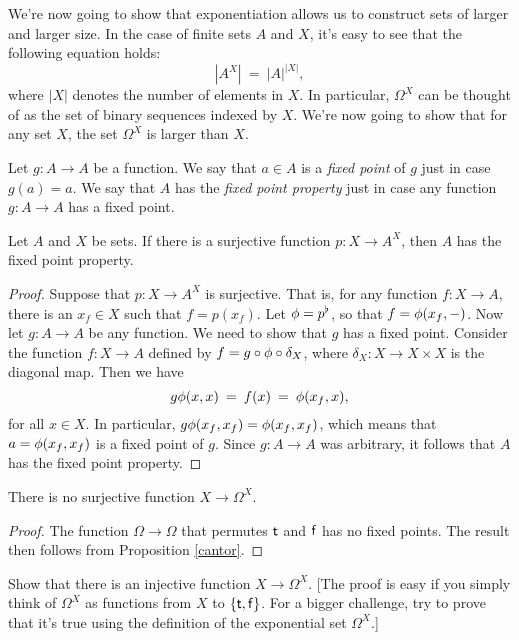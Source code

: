We're now going to show that exponentiation allows us to construct
sets of larger and larger size.  In the case of finite sets $A$ and
$X$, it's easy to see that the following equation holds:
\[ |A^X| \: = \: |A|^{|X|} ,\] where $|X|$ denotes the number of
elements in $X$.  In particular, $\Omega ^X$ can be thought of as the
set of binary sequences indexed by $X$.  We're now going to show that
for any set $X$, the set $\Omega ^X$ is larger than $X$.

\begin{defn} Let $g:A\to A$ be a function.  We say that $a\in A$ is a
  \emph{fixed point} of $g$ just in case $g(a)=a$.  We say that $A$
  has the \emph{fixed point property} just in case any function
  $g:A\to A$ has a fixed point. \end{defn}

\begin{prop} Let $A$ and $X$ be sets.  If there is a surjective
  function $p:X\to A^X$, then $A$ has the fixed point
  property. \label{cantor} \end{prop}

\begin{proof} Suppose that $p:X\to A^X$ is surjective.  That is, for
  any function $f:X\to A$, there is an $x_f\in X$ such that
  $f=p(x_f)$.  Let $\phi =p^\flat$, so that $f=\phi (x_f,-)$.  Now let
  $g:A\to A$ be any function.  We need to show that $g$ has a fixed
  point.  Consider the function $f:X\to A$ defined by $f=g\circ \phi
  \circ \delta _X$, where $\delta _X:X\to X\times X$ is the diagonal
  map.  Then we have
  \[ g\phi (x,x) \: = \: f(x) \: = \: \phi (x_f,x) ,\] for all $x\in X$.
  In particular, $g\phi (x_f,x_f)=\phi (x_f,x_f)$, which means that
  $a=\phi (x_f,x_f)$ is a fixed point of $g$.  Since $g:A\to A$ was
  arbitrary, it follows that $A$ has the fixed point property.
\end{proof}

\begin{prop} There is no surjective function $X\to \Omega
  ^X$. \end{prop}


\begin{proof} The function $\Omega\to \Omega$ that permutes $\mathsf{t}$ and
  $\mathsf{f}$ has no fixed points.  The result then follows from Proposition
  \ref{cantor}. \end{proof}

\begin{exercise} Show that there is an injective function $X\to \Omega
  ^X$.  [The proof is easy if you simply think of $\Omega ^X$ as
  functions from $X$ to $\{ \mathsf{t} ,\mathsf{f}\}$.  For a bigger challenge, try
  to prove that it's true using the definition of the exponential set
  $\Omega ^X$.]  \end{exercise}




